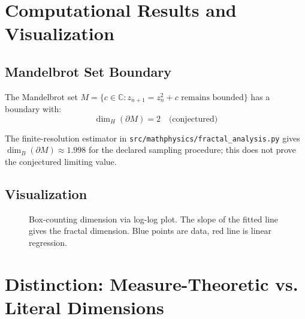 \section{Computational Results and Visualization}

\subsection{Mandelbrot Set Boundary}

The Mandelbrot set $M = \{c \in \mathbb{C} : z_{n+1} = z_n^2 + c \text{ remains bounded}\}$ has a boundary with:
\begin{equation}
    \dim_H(\partial M) = 2 \quad \text{(conjectured)}
\end{equation}

The finite-resolution estimator in \texttt{src/mathphysics/fractal\_analysis.py} gives $\dim_B(\partial M) \approx 1.998$ for the declared sampling procedure; this does not prove the conjectured limiting value.

\subsection{Visualization}

\begin{figure}[h]
\centering
{}
\caption{Box-counting dimension via log-log plot. The slope of the fitted line gives the fractal dimension. Blue points are data, red line is linear regression.}
\label{fig:box_counting}
\end{figure}

\section{Distinction: Measure-Theoretic vs. Literal Dimensions}

